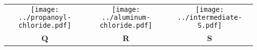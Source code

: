 \documentclass{article}
\begin{document}
	\begin{tabular}{ccc}
		\texttt{[image: ../propanoyl-chloride.pdf]} & \texttt{[image: ../aluminum-chloride.pdf]} & \texttt{[image: ../intermediate-S.pdf]} \\
		\textbf{Q} & \textbf{R} & \textbf{S}
	\end{tabular}
\end{document}
